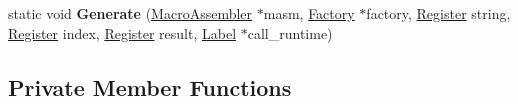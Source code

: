 \begin{DoxyCompactItemize}
\item 
static void {\bfseries Generate} (\hyperlink{classv8_1_1internal_1_1_macro_assembler}{Macro\+Assembler} $\ast$masm, \hyperlink{classv8_1_1internal_1_1_factory}{Factory} $\ast$factory, \hyperlink{structv8_1_1internal_1_1_register}{Register} string, \hyperlink{structv8_1_1internal_1_1_register}{Register} index, \hyperlink{structv8_1_1internal_1_1_register}{Register} result, \hyperlink{classv8_1_1internal_1_1_label}{Label} $\ast$call\+\_\+runtime)\hypertarget{classv8_1_1internal_1_1_string_char_load_generator_a5a8fd405ba1de3b197fb46c682ecf6cc}{}\label{classv8_1_1internal_1_1_string_char_load_generator_a5a8fd405ba1de3b197fb46c682ecf6cc}

\end{DoxyCompactItemize}
\subsection*{Private Member Functions}
